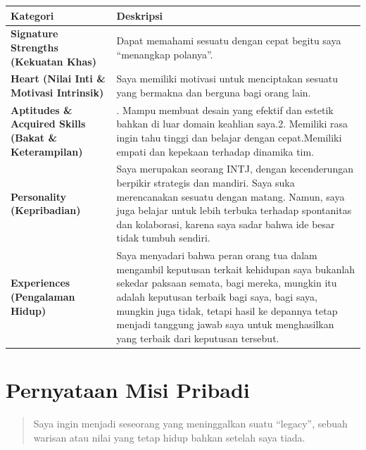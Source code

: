 \documentclass[
  letterpaper,
  DIV=11,
  numbers=noendperiod]{scrreprt}
\begin{document}
\begin{longtable}[]{@{}
  >{\raggedright\arraybackslash}p{}
  >{\raggedright\arraybackslash}p{}@{}}
\toprule\noalign{}
\begin{minipage}[b]{\linewidth}\raggedright
Kategori
\end{minipage} & \begin{minipage}[b]{\linewidth}\raggedright
Deskripsi
\end{minipage} \\
\midrule\noalign{}
\endhead
\bottomrule\noalign{}
\endlastfoot
\textbf{Signature Strengths (Kekuatan Khas)} & Dapat memahami sesuatu
dengan cepat begitu saya ``menangkap polanya''. \\
\textbf{Heart (Nilai Inti \& Motivasi Intrinsik)} & Saya memiliki
motivasi untuk menciptakan sesuatu yang bermakna dan berguna bagi orang
lain. \\
\textbf{Aptitudes \& Acquired Skills (Bakat \& Keterampilan)} & 1. Mampu
membuat desain yang efektif dan estetik bahkan di luar domain keahlian
saya.2. Memiliki rasa ingin tahu tinggi dan belajar dengan
cepat.Memiliki empati dan kepekaan terhadap dinamika tim. \\
\textbf{Personality (Kepribadian)} & Saya merupakan seorang INTJ, dengan
kecenderungan berpikir strategis dan mandiri. Saya suka merencanakan
sesuatu dengan matang. Namun, saya juga belajar untuk lebih terbuka
terhadap spontanitas dan kolaborasi, karena saya sadar bahwa ide besar
tidak tumbuh sendiri. \\
\textbf{Experiences (Pengalaman Hidup)} & Saya menyadari bahwa peran
orang tua dalam mengambil keputusan terkait kehidupan saya bukanlah
sekedar paksaan semata, bagi mereka, mungkin itu adalah keputusan
terbaik bagi saya, bagi saya, mungkin juga tidak, tetapi hasil ke
depannya tetap menjadi tanggung jawab saya untuk menghasilkan yang
terbaik dari keputusan tersebut. \\
\end{longtable}

\section{Pernyataan Misi Pribadi}\label{pernyataan-misi-pribadi}

\begin{quote}
Saya ingin menjadi seseorang yang meninggalkan suatu ``legacy'', sebuah
warisan atau nilai yang tetap hidup bahkan setelah saya tiada.
\end{quote}
\end{document}
